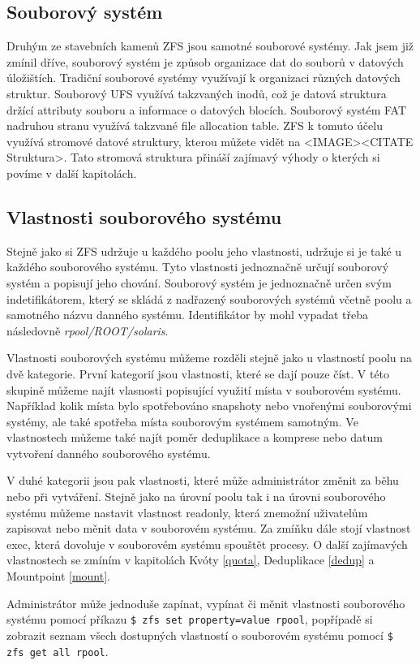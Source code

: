     \subsection{Souborový systém}
    Druhým ze stavebních kamenů ZFS jsou samotné souborové systémy. Jak jsem již zmínil dříve, souborový systém je způsob organizace dat do souborů v datových úložištích.
    Tradiční souborové systémy využívají k organizaci různých datových struktur. Souborový UFS využívá takzvaných inodů, což je datová struktura držící attributy souboru a informace o datových blocích. Souborový systém FAT nadruhou stranu využívá takzvané file allocation table. ZFS k tomuto účelu využívá stromové datové struktury, kterou můžete vidět na <IMAGE><CITATE Struktura>. Tato stromová struktura přináší zajímavý výhody o kterých si povíme v další kapitolách.
    \subsection{Vlastnosti souborového systému}
    Stejně jako si ZFS udržuje u každého poolu jeho vlastnosti, udržuje si je také u každého souborového systému. Tyto vlastnosti jednoznačně určují souborový systém a popisují jeho chování. Souborový systém je jednoznačně určen svým indetifikátorem, který se skládá z nadřazený souborových systémů včetně poolu a samotného názvu danného systému. Identifikátor by mohl vypadat třeba následovně \emph{rpool/ROOT/solaris}.

    Vlastnosti souborových systému můžeme rozděli stejně jako u vlastností poolu na dvě kategorie. První kategorií jsou vlastnosti, které se dají pouze číst. V této skupině můžeme najít vlasnosti popisující využití místa v souborovém systému. Například kolik místa bylo spotřebováno snapshoty nebo vnořenými souborovými systémy, ale také spotřeba místa souborovým systémem samotným. Ve vlastnostech můžeme také najít poměr deduplikace a komprese nebo datum vytvoření danného souborového systému.

    V duhé kategorii jsou pak vlastnosti, které může administrátor změnit za běhu nebo při vytváření. Stejně jako na úrovní poolu tak i na úrovni souborového systému můžeme nastavit vlastnost readonly, která znemožní uživatelům zapisovat nebo měnit data v souborovém systému. Za zmíňku dále stojí vlastnost exec, která dovoluje v souborovém systému spouštět procesy. O další zajímavých vlastnostech se zmíním v kapitolách Kvóty \ref{quota}, Deduplikace \ref{dedup} a Mountpoint \ref{mount}.

    Administrátor může jednoduše zapínat, vypínat či měnit vlastnosti souborového systému pomocí příkazu \verb|$ zfs set property=value rpool|, popřípadě si zobrazit seznam všech dostupných vlastností o souborovém systému pomocí \verb|$ zfs get all rpool|.

